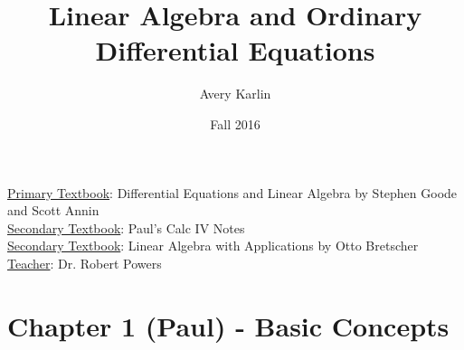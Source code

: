 \documentclass[11 pt, twoside]{article}
\begin{document}
\title{Linear Algebra and Ordinary Differential Equations}
\author{Avery Karlin}
\date{Fall 2016}
\newcommand{\textbook}{Differential Equations and Linear Algebra by Stephen Goode and Scott Annin}
\newcommand{\teacher}{Dr. Robert Powers}

\maketitle
\newpage
\hypertarget{content}{\tableofcontents}
\vspace{11pt}
\noindent
\underline{Primary Textbook}: \textbook\\
\underline{Secondary Textbook}: Paul's Calc IV Notes\\
\underline{Secondary Textbook}: Linear Algebra with Applications by Otto Bretscher
\underline{Teacher}: \teacher
\newpage

\section{Chapter 1 (Paul) - Basic Concepts}
\end{document}
